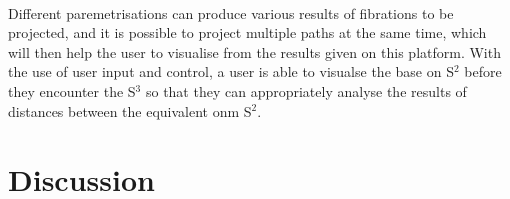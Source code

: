 \documentclass[12pt]{article} %
\begin{document}
\begin{flushleft}
\paragraph{} Different paremetrisations can produce various results of fibrations to be projected, and  it is possible to project multiple paths at the same time, which will then help the user to visualise from the results given on this platform. With the use of user input and control, a user is able to visualse the base on S$^{2}$ before they encounter the S$^{3}$ so that they can appropriately analyse the results of distances between the equivalent onm S$^{2}$.

\section{Discussion}


\end{flushleft}
\end{document}
